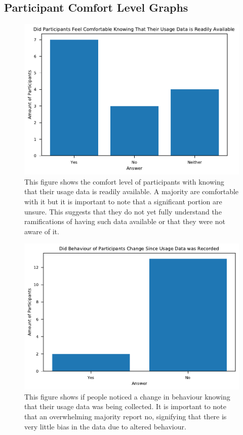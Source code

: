\documentclass{l4proj}
\begin{document}
\begin{appendices}
\chapter{Participant Comfort Level Graphs} \label{app_appendix}
\begin{figure}[htb]
    \centering
    \includegraphics[width=\linewidth]{images/survey/usage_stats.pdf}
    \caption{This figure shows the comfort level of participants with knowing that their usage data is readily available. A majority are comfortable with it but it is important to note that a significant portion are unsure. This suggests that they do not yet fully understand the ramifications of having such data available or that they were not aware of it.}
    \label{fig:usage_stats} 
\end{figure}

\begin{figure}[htb]
    \centering
    \includegraphics[width=\linewidth]{images/survey/behaviour_change.pdf}
    \caption{This figure shows if people noticed a change in behaviour knowing that their usage data was being collected. It is important to note that an overwhelming majority report no, signifying that there is very little bias in the data due to altered behaviour.}
    \label{fig:behaviour_change} 
\end{figure}


\end{appendices}
\end{document}
